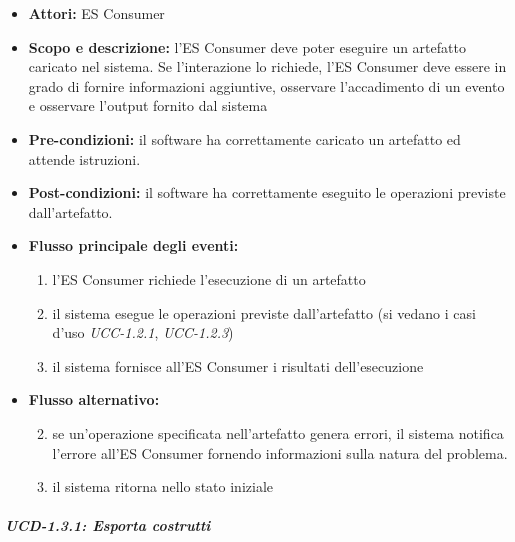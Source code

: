\begin{itemize}
	\item \textbf{Attori:} ES Consumer
	\item \textbf{Scopo e descrizione:} l'ES Consumer deve poter eseguire un artefatto caricato nel sistema. Se l'interazione lo richiede, l'ES Consumer deve essere in grado di fornire informazioni aggiuntive, osservare l'accadimento di un evento e osservare l'output fornito dal sistema
	\item \textbf{Pre-condizioni:} il software ha correttamente caricato un artefatto ed attende istruzioni.
	\item \textbf{Post-condizioni:} il software ha correttamente eseguito le operazioni previste dall'artefatto.
	\item \textbf{Flusso principale degli eventi:}
		\begin{enumerate}
			\item l'ES Consumer richiede l'esecuzione di un artefatto
			\item il sistema esegue le operazioni previste dall'artefatto (si vedano i casi d'uso \emph{UCC-1.2.1}, \emph{UCC-1.2.3})
			\item il sistema fornisce all'ES Consumer i risultati dell'esecuzione		
		\end{enumerate}
	\item \textbf{Flusso alternativo:} 
		\begin{enumerate}
			\setcounter{enumi}{1}
			\item se un'operazione specificata nell'artefatto genera errori, il sistema notifica l'errore all'ES Consumer fornendo informazioni sulla natura del problema.
			\item il sistema ritorna nello stato iniziale
		\end{enumerate}
\end{itemize}

\subparagraph{UCD-1.3.1: Esporta costrutti}

